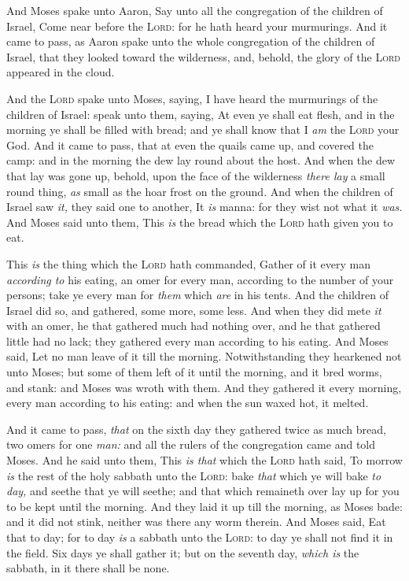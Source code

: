 \documentclass[11pt,letterpaper,oneside]{memoir}
\begin{document}
And Moses spake unto Aaron, Say unto all the congregation of the
children of Israel, Come near before the \textsc{Lord}: for he hath
heard your murmurings. And it came to pass, as Aaron spake unto the
whole congregation of the children of Israel, that they looked toward
the wilderness, and, behold, the glory of the \textsc{Lord} appeared in
the cloud.

And the \textsc{Lord} spake unto Moses, saying, I have heard the
murmurings of the children of Israel: speak unto them, saying, At even
ye shall eat flesh, and in the morning ye shall be filled with bread;
and ye shall know that I \emph{am} the \textsc{Lord} your God. And it
came to pass, that at even the quails came up, and covered the camp: and
in the morning the dew lay round about the host. And when the dew that
lay was gone up, behold, upon the face of the wilderness \emph{there
lay} a small round thing, \emph{as} small as the hoar frost on the
ground. And when the children of Israel saw \emph{it,} they said one to
another, It \emph{is} manna: for they wist not what it \emph{was.} And
Moses said unto them, This \emph{is} the bread which the \textsc{Lord}
hath given you to eat.

This \emph{is} the thing which the \textsc{Lord} hath commanded, Gather
of it every man \emph{according to} his eating, an omer for every man,
according to the number of your persons; take ye every man for
\emph{them} which \emph{are} in his tents. And the children of Israel
did so, and gathered, some more, some less. And when they did mete
\emph{it} with an omer, he that gathered much had nothing over, and he
that gathered little had no lack; they gathered every man according to
his eating. And Moses said, Let no man leave of it till the morning.
Notwithstanding they hearkened not unto Moses; but some of them left of
it until the morning, and it bred worms, and stank: and Moses was wroth
with them. And they gathered it every morning, every man according to
his eating: and when the sun waxed hot, it melted.

And it came to pass, \emph{that} on the sixth day they gathered twice as
much bread, two omers for one \emph{man:} and all the rulers of the
congregation came and told Moses. And he said unto them, This \emph{is
that} which the \textsc{Lord} hath said, To morrow \emph{is} the rest of
the holy sabbath unto the \textsc{Lord}: bake \emph{that} which ye will
bake \emph{to day,} and seethe that ye will seethe; and that which
remaineth over lay up for you to be kept until the morning. And they
laid it up till the morning, as Moses bade: and it did not stink,
neither was there any worm therein. And Moses said, Eat that to day; for
to day \emph{is} a sabbath unto the \textsc{Lord}: to day ye shall not
find it in the field. Six days ye shall gather it; but on the seventh
day, \emph{which is} the sabbath, in it there shall be none.
\end{document}
